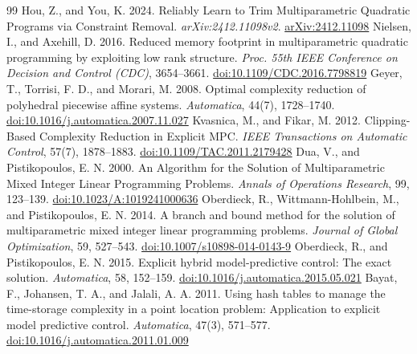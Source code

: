 \begin{thebibliography}{99}
 Hou, Z., and You, K. 2024. Reliably Learn to Trim Multiparametric Quadratic Programs via Constraint Removal. \emph{arXiv:2412.11098v2}. \href{https://arxiv.org/abs/2412.11098}{arXiv:2412.11098}
 Nielsen, I., and Axehill, D. 2016. Reduced memory footprint in multiparametric quadratic programming by exploiting low rank structure. \emph{Proc. 55th IEEE Conference on Decision and Control (CDC)}, 3654--3661. \href{https://login.ezproxy.lib.purdue.edu/login?url=https://doi.org/10.1109/CDC.2016.7798819}{doi:10.1109/CDC.2016.7798819}
 Geyer, T., Torrisi, F. D., and Morari, M. 2008. Optimal complexity reduction of polyhedral piecewise affine systems. \emph{Automatica}, 44(7), 1728--1740. \href{https://login.ezproxy.lib.purdue.edu/login?url=https://doi.org/10.1016/j.automatica.2007.11.027}{doi:10.1016/j.automatica.2007.11.027}
 Kvasnica, M., and Fikar, M. 2012. Clipping-Based Complexity Reduction in Explicit {MPC}. \emph{IEEE Transactions on Automatic Control}, 57(7), 1878--1883. \href{https://login.ezproxy.lib.purdue.edu/login?url=https://doi.org/10.1109/TAC.2011.2179428}{doi:10.1109/TAC.2011.2179428}
 Dua, V., and Pistikopoulos, E. N. 2000. An Algorithm for the Solution of Multiparametric Mixed Integer Linear Programming Problems. \emph{Annals of Operations Research}, 99, 123--139. \href{https://login.ezproxy.lib.purdue.edu/login?url=https://doi.org/10.1023/A:1019241000636}{doi:10.1023/A:1019241000636}
 Oberdieck, R., Wittmann-Hohlbein, M., and Pistikopoulos, E. N. 2014. A branch and bound method for the solution of multiparametric mixed integer linear programming problems. \emph{Journal of Global Optimization}, 59, 527--543. \href{https://login.ezproxy.lib.purdue.edu/login?url=https://doi.org/10.1007/s10898-014-0143-9}{doi:10.1007/s10898-014-0143-9}
 Oberdieck, R., and Pistikopoulos, E. N. 2015. Explicit hybrid model-predictive control: The exact solution. \emph{Automatica}, 58, 152--159. \href{https://login.ezproxy.lib.purdue.edu/login?url=https://doi.org/10.1016/j.automatica.2015.05.021}{doi:10.1016/j.automatica.2015.05.021}
 Bayat, F., Johansen, T. A., and Jalali, A. A. 2011. Using hash tables to manage the time-storage complexity in a point location problem: Application to explicit model predictive control. \emph{Automatica}, 47(3), 571--577. \href{https://login.ezproxy.lib.purdue.edu/login?url=https://doi.org/10.1016/j.automatica.2011.01.009}{doi:10.1016/j.automatica.2011.01.009}

\end{thebibliography}
